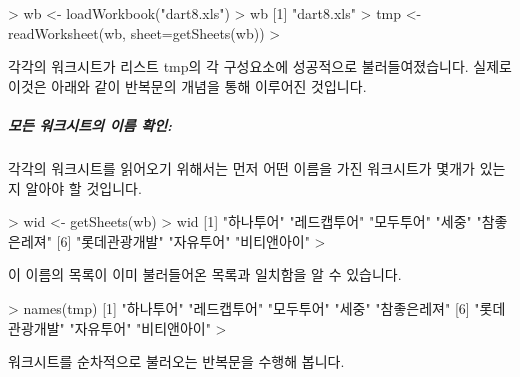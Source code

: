 \begin{Schunk}
\begin{Soutput}
> wb <- loadWorkbook("dart8.xls")
> wb
[1] "dart8.xls"
> tmp <- readWorksheet(wb, sheet=getSheets(wb))
>
\end{Soutput}
\end{Schunk}

각각의 워크시트가 리스트 tmp의 각 구성요소에 성공적으로 불러들여졌습니다. 
실제로 이것은 아래와 같이 반복문의 개념을 통해 이루어진 것입니다.

\subparagraph{모든 워크시트의 이름 확인:} 
각각의 워크시트를 읽어오기 위해서는 먼저 어떤 이름을 가진 워크시트가 몇개가 있는지 알아야 할 것입니다.

\begin{Schunk}
\begin{Soutput}
> wid <- getSheets(wb)
> wid
[1] "하나투어"     "레드캡투어"   "모두투어"     "세중"         "참좋은레져"  
[6] "롯데관광개발" "자유투어"     "비티앤아이"  
> 
\end{Soutput}
\end{Schunk}

이 이름의 목록이 이미 불러들어온 목록과 일치함을 알 수 있습니다.

\begin{Schunk}
\begin{Soutput}
> names(tmp)
[1] "하나투어"     "레드캡투어"   "모두투어"     "세중"         "참좋은레져"  
[6] "롯데관광개발" "자유투어"     "비티앤아이"  
> 
\end{Soutput}
\end{Schunk}

워크시트를 순차적으로 불러오는 반복문을 수행해 봅니다.

